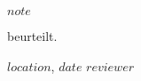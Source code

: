 
\parindent=0pt
\begin{center}
    \textcolor{headcolor}{\textbf{$note$}}
\end{center}

\parindent=0pt
beurteilt.

\bigskip
\bigskip
\bigskip
\parindent=0pt
$location$, $date$\newline
$reviewer$\newline





